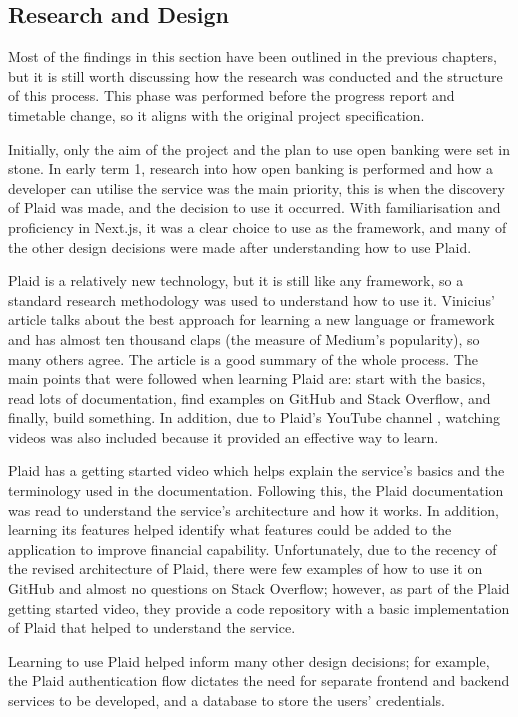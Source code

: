 \subsection{Research and Design}
Most of the findings in this section have been outlined in the previous chapters, but it is still worth discussing how the research was conducted and the structure of this process. This phase was performed before the progress report and timetable change, so it aligns with the original project specification.

Initially, only the aim of the project and the plan to use open banking were set in stone. In early term 1, research into how open banking is performed and how a developer can utilise the service was the main priority, this is when the discovery of Plaid was made, and the decision to use it occurred. With familiarisation and proficiency in Next.js, it was a clear choice to use as the framework, and many of the other design decisions were made after understanding how to use Plaid.

Plaid is a relatively new technology, but it is still like any framework, so a standard research methodology was used to understand how to use it. Vinicius' article \cite{FrameworkLearning} talks about the best approach for learning a new language or framework and has almost ten thousand claps (the measure of Medium's popularity), so many others agree. The article is a good summary of the whole process. The main points that were followed when learning Plaid are: start with the basics, read lots of documentation, find examples on GitHub and Stack Overflow, and finally, build something. In addition, due to Plaid's YouTube channel \cite{PlaidYouTube}, watching videos was also included because it provided an effective way to learn.

Plaid has a getting started video which helps explain the service's basics and the terminology used in the documentation. Following this, the Plaid documentation was read to understand the service's architecture and how it works. In addition, learning its features helped identify what features could be added to the application to improve financial capability. Unfortunately, due to the recency of the revised architecture of Plaid, there were few examples of how to use it on GitHub and almost no questions on Stack Overflow; however, as part of the Plaid getting started video, they provide a code repository with a basic implementation of Plaid that helped to understand the service.

Learning to use Plaid helped inform many other design decisions; for example, the Plaid authentication flow dictates the need for separate frontend and backend services to be developed, and a database to store the users' credentials.

